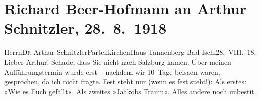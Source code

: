 

         
         \renewcommand{\erwaehntePersonen}{Personen: Olga Schnitzler, Elisabeth Steinrück, Albert Steinrück}
         \renewcommand{\erwaehnteOrte}{Orte: Bad Ischl, Garmisch-Partenkirchen, Haus Tannenberg, Partenkirchen, Salzburg, Wien}
         \renewcommand{\erwaehnteWerke}{Werke: Jaákobs Traum. Ein Vorspiel, Wie es euch gefällt}
               \section[Richard Beer-Hofmann an Arthur Schnitzler, 28. 8. 1918]{ Richard Beer-Hofmann an Arthur Schnitzler,
               28. 8. 1918}\nopagebreak{}\rehead{ }\begin{ledgroupsized}[t]{13cm}\normalsize\beginnumbering \toendnotes[C]{\smallbreak\pagebreak[2]} 
\toendnotes[C]{\smallbreak}\pstart{}{\pb}Herrn\pend{}\pstart{}D\textsc{r} Arthur Schnitzler\pend{}\pstart{}Partenkirchen\pend{}\pstart{}Haus Tannenberg\pend{}{\bigskip}\pstart
           \raggedleft{}{\pb}Bad-Ischl28. VIII. 18.\pend
           \pstart
           Lieber Arthur! Schade, dass Sie nicht nach Salzburg kamen. Über meinen Aufführungstermin wurde erst –
               nachdem wir 10 Tage beisa{\geminationm}en waren, gesprochen, da ich
               nicht fragte. Fest steht  nur \introOben{}(wenn es fest steht!\introOben{}): Als erstes: »Wie es
                  Euch gefällt«. Als zweites »Jaakobs
               Traum«. Alles andere noch unbesti{\geminationm}t.

\end{ledgroupsized}
